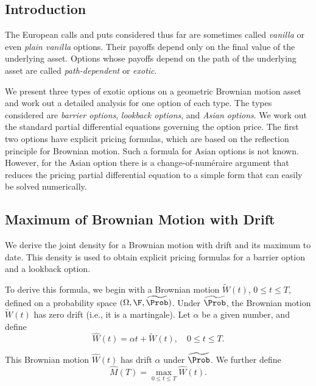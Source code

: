 \subsection{Introduction}
The European calls and puts considered thus far are sometimes called \textit{vanilla} or even \textit{plain vanilla} options. Their payoffs depend only on the final value of the underlying asset. Options whose payoffs depend on the path of the underlying asset are called \textit{path-dependent} or \textit{exotic}.

We present three types of exotic options on a geometric Brownian motion asset and work out a detailed analysis for one option of each type. The types considered are \textit{barrier options}, \textit{lookback options}, and \textit{Asian options}. We work out the standard partial differential equations governing the option price. The first two options have explicit pricing formulas, which are based on the reflection principle for Brownian motion. Such a formula for Asian options is not known. However, for the Asian option there is a change-of-num\'{e}raire argument that reduces the pricing partial differential equation to a simple form that can easily be solved numerically.

\subsection{Maximum of Brownian Motion with Drift}

We derive the joint density for a Brownian motion with drift and its maximum to date. This density is used to obtain explicit pricing formulas for a barrier option and a lookback option.

To derive this formula, we begin with a Brownian motion \(\widetilde{W}(t)\), \(0 \le t \le T\), defined on a probability space \((\Omega, \F, \widetilde{\Prob})\). Under \(\widetilde{\Prob}\), the Brownian motion \(\widetilde{W}(t)\) has zero drift (i.e., it is a martingale). Let \(\alpha\) be a given number, and define
\begin{equation}
	\widehat{W}(t) = \alpha t + \widetilde{W}(t), \quad 0 \le t \le T.
	\label{eq:DriftBrownianDef}
\end{equation}

This Brownian motion \(\widehat{W}(t)\) has drift \(\alpha\) under \(\widetilde{\Prob}\). We further define
\begin{equation}
	\widehat{M}(T) = \max_{0 \le t \le T} \widehat{W}(t).
	\label{eq:MaxProcessDef}
\end{equation}


